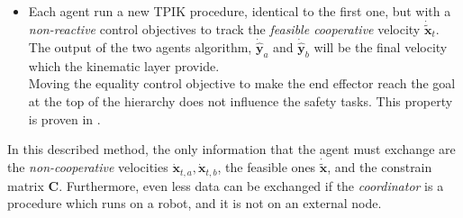 \begin{itemize}
	\item Each agent run a new TPIK procedure, identical to the first one, but with a \textit{non-reactive} control objectives to track the \textit{feasible cooperative} velocity $\dot{\tilde{\boldsymbol{x}}}_t$. The output of the two agents algorithm, $\dot{\boldsymbol{\hat{y}}}_a$ and $\dot{\boldsymbol{\hat{y}}}_b$ will be the final velocity which the kinematic layer provide.\\
	Moving the equality control objective to make the end effector reach the goal at the top of the hierarchy does not influence the safety tasks. This property is proven in \cite{tesiWander}.
\end{itemize}

In this described method, the only information that the agent must exchange are the
\textit{non-cooperative} velocities $\dot{\boldsymbol{x}}_{t,a}, \dot{\boldsymbol{x}}_{t,b}$, the feasible ones $\dot{\boldsymbol{\tilde{x}}}$, and the constrain matrix $\boldsymbol{C}$. Furthermore, even less data can be exchanged if the \textit{coordinator} is a procedure which runs on a robot, and it is not on an external node. 





